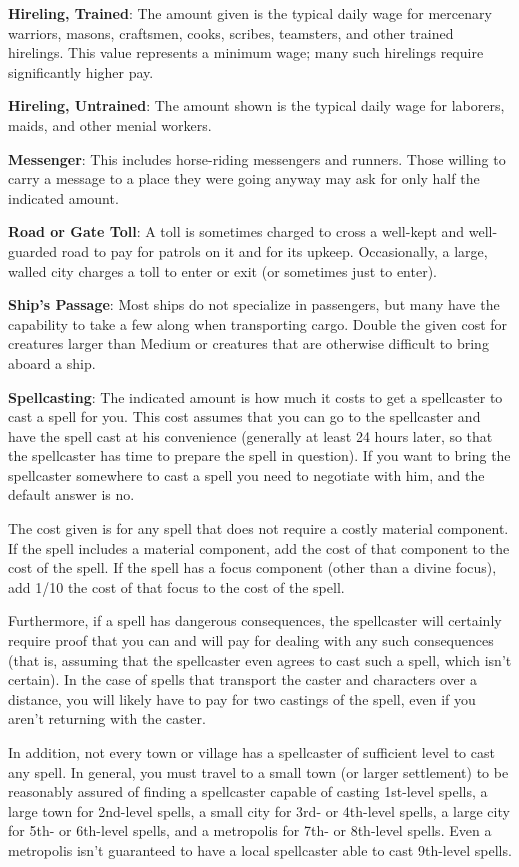 \textbf{Hireling, Trained}: The amount given is the typical daily wage for mercenary warriors, masons, craftsmen, cooks, scribes, teamsters, and other trained hirelings. This value represents a minimum wage; many such hirelings require significantly higher pay.
		
\textbf{Hireling, Untrained}: The amount shown is the typical daily wage for laborers, maids, and other menial workers.
		
\textbf{Messenger}: This includes horse-riding messengers and runners. Those willing to carry a message to a place they were going anyway may ask for only half the indicated amount.
		
\textbf{Road or Gate Toll}: A toll is sometimes charged to cross a well-kept and well-guarded road to pay for patrols on it and for its upkeep. Occasionally, a large, walled city charges a toll to enter or exit (or sometimes just to enter).
		
\textbf{Ship's Passage}: Most ships do not specialize in passengers, but many have the capability to take a few along when transporting cargo. Double the given cost for creatures larger than Medium or creatures that are otherwise difficult to bring aboard a ship.
		
\textbf{Spellcasting}: The indicated amount is how much it costs to get a spellcaster to cast a spell for you. This cost assumes that you can go to the spellcaster and have the spell cast at his convenience (generally at least 24 hours later, so that the spellcaster has time to prepare the spell in question). If you want to bring the spellcaster somewhere to cast a spell you need to negotiate with him, and the default answer is no.
		
The cost given is for any spell that does not require a costly material component. If the spell includes a material component, add the cost of that component to the cost of the spell. If the spell has a focus component (other than a divine focus), add 1/10 the cost of that focus to the cost of the spell.
		
Furthermore, if a spell has dangerous consequences, the spellcaster will certainly require proof that you can and will pay for dealing with any such consequences (that is, assuming that the spellcaster even agrees to cast such a spell, which isn't certain). In the case of spells that transport the caster and characters over a distance, you will likely have to pay for two castings of the spell, even if you aren't returning with the caster.
		
In addition, not every town or village has a spellcaster of sufficient level to cast any spell. In general, you must travel to a small town (or larger settlement) to be reasonably assured of finding a spellcaster capable of casting 1st-level spells, a large town for 2nd-level spells, a small city for 3rd- or 4th-level spells, a large city for 5th- or 6th-level spells, and a metropolis for 7th- or 8th-level spells. Even a metropolis isn't guaranteed to have a local spellcaster able to cast 9th-level spells.
	

